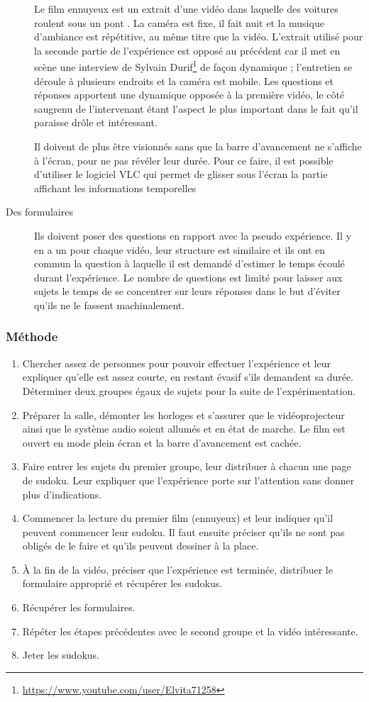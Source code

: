 \documentclass[12pt,fleqn,oneside,french,openany]{book} %
\begin{document}
\begin{description}
	Le film ennuyeux est un extrait d'une vidéo dans laquelle des voitures roulent sous un pont \cite{vidnul}. La caméra est fixe, il fait nuit et la musique d'ambiance est répétitive, au même titre que la vidéo. L'extrait utilisé pour la seconde partie de l'expérience  est opposé au précédent car il met en scène une interview de Sylvain Durif\footnote{\url{https://www.youtube.com/user/Elvita71258}} de façon dynamique \cite{vidcool}; l'entretien se déroule à plusieurs endroits et la caméra est mobile. Les questions et réponses apportent une dynamique opposée à la première vidéo, le côté saugrenu de l'intervenant étant l'aspect le plus important dans le fait qu'il paraisse drôle et intéressant. 

	Il doivent de plus être visionnés sans que la barre d'avancement ne s'affiche à l'écran, pour ne pas révéler leur durée. Pour ce faire, il est possible d'utiliser le logiciel VLC qui permet de glisser sous l'écran la partie affichant les informations temporelles  \item[Des formulaires] Ils doivent poser des questions en rapport avec la pseudo expérience. Il y en a un pour chaque vidéo, leur structure est similaire et ils ont en commun la question à laquelle il est demandé d'estimer le temps écoulé durant l'expérience. Le nombre de questions est limité pour laisser aux sujets le temps de se concentrer sur leurs réponses dans le but d'éviter qu'ils ne le fassent machinalement.
\end{description}

\subsubsection{Méthode} \label{sssec:methode1}
\begin{enumerate}
	\item Chercher assez de personnes pour pouvoir effectuer l'expérience et leur expliquer qu'elle est assez courte, en restant évasif s'ils demandent sa durée. Déterminer deux groupes égaux de sujets pour la suite de l'expérimentation.
	\item Préparer la salle, démonter les horloges et s'assurer que le vidéoprojecteur ainsi que le système audio soient allumés et en état de marche. Le film est ouvert en mode plein écran et la barre d'avancement est cachée.
	\item Faire entrer les sujets du premier groupe, leur distribuer à chacun une page de sudoku. Leur expliquer que l'expérience porte sur l'attention sans donner plus d'indications. 
	\item Commencer la lecture du premier film (ennuyeux) et leur indiquer qu'il peuvent commencer leur sudoku. Il faut ensuite préciser qu'ils ne sont pas obligés de le faire et qu'ils peuvent dessiner à la place. 
	\item À la fin de la vidéo, préciser que l'expérience est terminée, distribuer le formulaire approprié et récupérer les sudokus.
	\item Récupérer les formulaires.
	\item Répéter les étapes précédentes avec le second groupe et la vidéo intéressante.
	\item Jeter les sudokus.
\end{enumerate}
\end{document}
